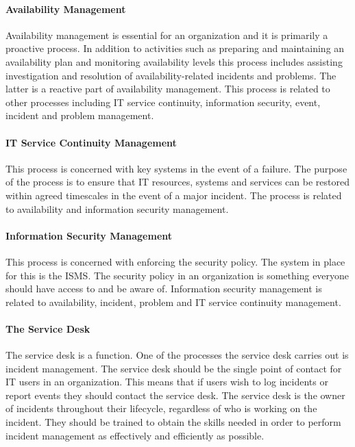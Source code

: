 \paragraph{Availability Management}
Availability management is essential for an organization and it is primarily a proactive process. In addition to activities such as preparing and maintaining an availability plan and monitoring availability levels this process includes assisting investigation and resolution of availability-related incidents and problems. The latter is a reactive part of availability management. This process is related to other processes including IT service continuity, information security, event, incident and problem management.

\paragraph{IT Service Continuity Management}
This process is concerned with key systems in the event of a failure. The purpose of the process is to ensure that IT resources, systems and services can be restored within agreed timescales in the event of a major incident. The process is related to availability and information security management.

\paragraph{Information Security Management}
This process is concerned with enforcing the security policy. The system in place for this is the \acf{ISMS}. The security policy in an organization is something everyone should have access to and be aware of. Information security management is related to availability, incident, problem and IT service continuity management. 

\paragraph{The Service Desk}
The service desk is a function. One of the processes the service desk carries out is incident management. The service desk should be the single point of contact for IT users in an organization. This means that if users wish to log incidents or report events they should contact the service desk. The service desk is the owner of incidents throughout their lifecycle, regardless of who is working on the incident. They should be trained to obtain the skills needed in order to perform incident management as effectively and efficiently as possible.

